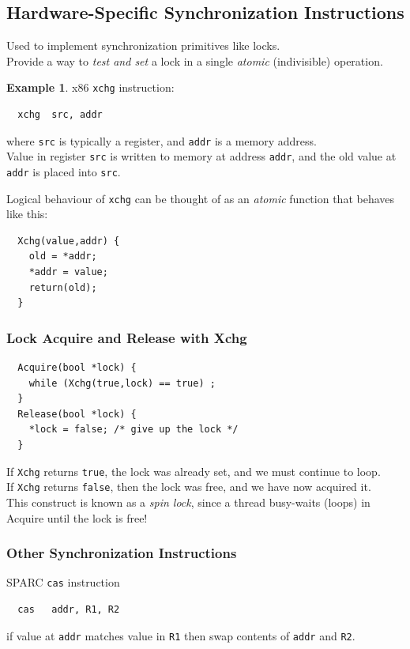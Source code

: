 \documentclass[12pt]{article}
\theoremstyle{plain}
\theoremstyle{definition}
\newtheorem*{ex*}{Example}
\begin{document}
\subsection{Hardware-Specific Synchronization Instructions}
Used to implement synchronization primitives like locks. \\
Provide a way to \emph{test and set} a lock in a single \emph{atomic} (indivisible) operation.
\begin{ex*}
x86 \texttt{xchg} instruction:
\begin{verbatim}
  xchg  src, addr
\end{verbatim}
where \texttt{src} is typically a register, and \texttt{addr} is a memory address. \\
Value in register \texttt{src} is written to memory at address \texttt{addr}, and the old value at \texttt{addr} is placed into \texttt{src}.
\end{ex*}
Logical behaviour of \texttt{xchg} can be thought of as an \emph{atomic} function that behaves like this:
\begin{verbatim}
  Xchg(value,addr) {
    old = *addr;
    *addr = value;
    return(old);
  }
\end{verbatim}

\subsubsection{Lock Acquire and Release with Xchg}
\begin{verbatim}
  Acquire(bool *lock) {
    while (Xchg(true,lock) == true) ;
  }
  Release(bool *lock) {
    *lock = false; /* give up the lock */
  }
\end{verbatim}
If \texttt{Xchg} returns \texttt{true}, the lock was already set, and we must continue to loop. \\
If \texttt{Xchg} returns \texttt{false}, then the lock was free, and we have now acquired it. \\

This construct is known as a \emph{spin lock}, since a thread busy-waits (loops) in Acquire until the lock is free!

\subsubsection{Other Synchronization Instructions}
SPARC \texttt{cas} instruction
\begin{verbatim}
  cas   addr, R1, R2
\end{verbatim}
if value at \texttt{addr} matches value in \texttt{R1} then swap contents of \texttt{addr} and \texttt{R2}. \\
\end{document}
